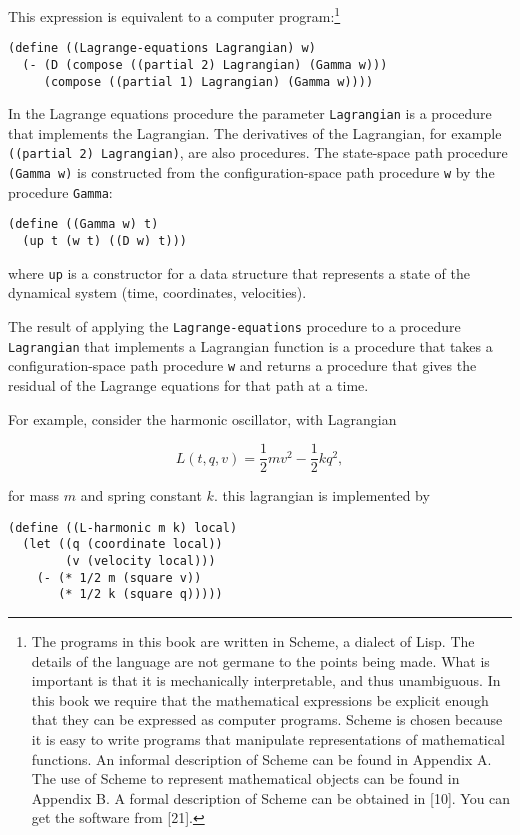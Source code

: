 \documentclass[11pt]{article}
\begin{document}
This expression is equivalent to a computer program:\footnote{The programs in this book are written in Scheme, a dialect of Lisp. The
details of the language are not germane to the points being made. What is
important is that it is mechanically interpretable, and thus unambiguous. In
this book we require that the mathematical expressions be explicit enough that
they can be expressed as computer programs. Scheme is chosen because it is easy
to write programs that manipulate representations of mathematical functions. An
informal description of Scheme can be found in Appendix A. The use of Scheme to
represent mathematical objects can be found in Appendix B. A formal description
of Scheme can be obtained in [10]. You can get the software from [21].}

\begin{verbatim}
(define ((Lagrange-equations Lagrangian) w)
  (- (D (compose ((partial 2) Lagrangian) (Gamma w)))
     (compose ((partial 1) Lagrangian) (Gamma w))))
\end{verbatim}

In the Lagrange equations procedure the parameter \texttt{Lagrangian} is a procedure
that implements the Lagrangian. The derivatives of the Lagrangian, for example
\texttt{((partial 2) Lagrangian)}, are also procedures. The state-space path procedure
\texttt{(Gamma w)} is constructed from the configuration-space path procedure \texttt{w} by
the procedure \texttt{Gamma}:

\begin{verbatim}
(define ((Gamma w) t)
  (up t (w t) ((D w) t)))
\end{verbatim}

where \texttt{up} is a constructor for a data structure that represents a state of the
dynamical system (time, coordinates, velocities).

The result of applying the \texttt{Lagrange-equations} procedure to a procedure
\texttt{Lagrangian} that implements a Lagrangian function is a procedure that takes a
configuration-space path procedure \texttt{w} and returns a procedure that gives the
residual of the Lagrange equations for that path at a time.

For example, consider the harmonic oscillator, with Lagrangian

$$L(t, q, v) = \frac{1}{2}mv^2 - \frac{1}{2}kq^2,$$

for mass \(m\) and spring constant \(k\). this lagrangian is implemented by

\begin{verbatim}
(define ((L-harmonic m k) local)
  (let ((q (coordinate local))
        (v (velocity local)))
    (- (* 1/2 m (square v))
       (* 1/2 k (square q)))))
\end{verbatim}
\end{document}
